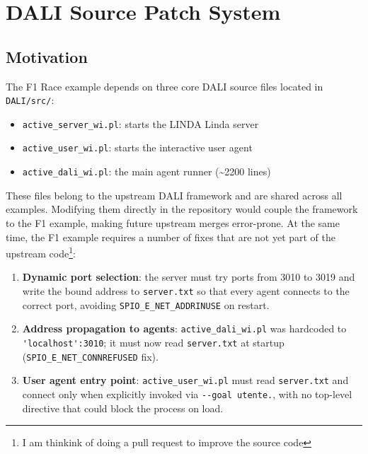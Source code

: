 \section{DALI Source Patch System}
\label{sec:patch-system}

\subsection{Motivation}

The F1 Race example depends on three core DALI source files located in
\texttt{DALI/src/}:

\begin{itemize}[leftmargin=2em]
  \item \texttt{active\_server\_wi.pl}: starts the LINDA Linda server
  \item \texttt{active\_user\_wi.pl}: starts the interactive user agent
  \item \texttt{active\_dali\_wi.pl}: the main agent runner (\textasciitilde2200 lines)
\end{itemize}

\noindent
These files belong to the upstream DALI framework and are shared across all
examples. Modifying them directly in the repository would couple the framework
to the F1 example, making future upstream merges error-prone.  At the same
time, the F1 example requires a number of fixes that are not yet part of the
upstream code\footnote{I am thinkink of doing a pull request to improve the source code}:

\begin{enumerate}[leftmargin=2em]
  \item \textbf{Dynamic port selection}: the server must try ports from 3010 to 3019
        and write the bound address to \texttt{server.txt} so that every agent
        connects to the correct port, avoiding \texttt{SPIO\_E\_NET\_ADDRINUSE}
        on restart.
  \item \textbf{Address propagation to agents}: \texttt{active\_dali\_wi.pl}
        was hardcoded to \lstinline|'localhost':3010|; it must now read
        \texttt{server.txt} at startup (\texttt{SPIO\_E\_NET\_CONNREFUSED} fix).
  \item \textbf{User agent entry point}: \texttt{active\_user\_wi.pl}
        must read \texttt{server.txt} and connect only when explicitly invoked
        via \lstinline|--goal utente.|, with no top-level directive that could
        block the process on load.
\end{enumerate}

